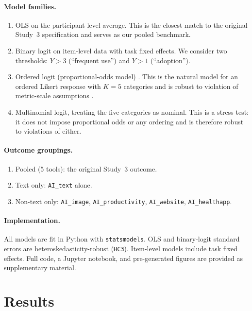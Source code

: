 \documentclass[11pt]{article}
\begin{document}
\paragraph{Model families.}
\begin{enumerate}
  \item OLS on the participant-level average. This is the closest
    match to the original Study~3 specification and serves as our pooled
    benchmark.
  \item Binary logit on item-level data with task fixed effects. We
    consider two thresholds: $Y > 3$ (``frequent use'') and $Y > 1$
    (``adoption'').
  \item Ordered logit (proportional-odds model)
    \citep{mccullagh1980regression}. This is the natural model for an
    ordered Likert response with $K = 5$ categories and is robust to violation
    of metric-scale assumptions \citep{liddell2018analyzing}.
  \item Multinomial logit, treating the five categories as nominal.
    This is a stress test: it does not impose proportional odds or any
    ordering and is therefore robust to violations of either.
\end{enumerate}

\paragraph{Outcome groupings.}
\begin{enumerate}
  \item Pooled (5 tools): the original Study~3 outcome.
  \item Text only: \texttt{AI\_text} alone.
  \item Non-text only: \texttt{AI\_image},
    \texttt{AI\_productivity}, \texttt{AI\_website}, \texttt{AI\_healthapp}.
\end{enumerate}

\paragraph{Implementation.} All models are fit in Python with
\texttt{statsmodels}. OLS and binary-logit standard errors are
heteroskedasticity-robust (\texttt{HC3}). Item-level models include
task fixed effects. Full code, a Jupyter notebook, and pre-generated figures
are provided as supplementary material.

\section{Results}
\end{document}
